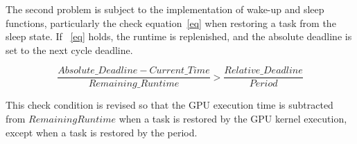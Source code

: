 The second problem is subject to the implementation of wake-up and sleep functions, particularly the check equation~\ref{eq} when restoring a task from the sleep state.
If ~\ref{eq} holds, the runtime is replenished, and the absolute deadline is set to the next cycle deadline.

{\scriptsize
\begin{equation}
\frac{Absolute\_Deadline - Current\_Time}{Remaining\_Runtime} > \frac{Relative\_Deadline}{Period} \label{eq}
\end{equation}
}

This check condition is revised so that the GPU execution time is subtracted from $Remaining Runtime$ when a task is restored by the GPU kernel execution, except when a task is restored by the period.
